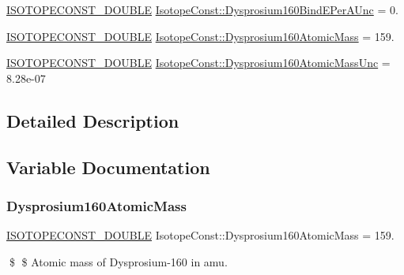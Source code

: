\begin{DoxyCompactItemize}
\mbox{\hyperlink{group___isotope_const-_macros_ga8f45a7272ce02c0b4c65c44636ed719a}{I\+S\+O\+T\+O\+P\+E\+C\+O\+N\+S\+T\+\_\+\+D\+O\+U\+B\+LE}} \mbox{\hyperlink{group___isotope_const-_dysprosium-_dy160_gaa8e61be4e1499f42c1e5876c6f315f16}{Isotope\+Const\+::\+Dysprosium160\+Bind\+E\+Per\+A\+Unc}} = 0.
\item 
\mbox{\hyperlink{group___isotope_const-_macros_ga8f45a7272ce02c0b4c65c44636ed719a}{I\+S\+O\+T\+O\+P\+E\+C\+O\+N\+S\+T\+\_\+\+D\+O\+U\+B\+LE}} \mbox{\hyperlink{group___isotope_const-_dysprosium-_dy160_ga260ca81902a70afa72e9724f9740c022}{Isotope\+Const\+::\+Dysprosium160\+Atomic\+Mass}} = 159.
\item 
\mbox{\hyperlink{group___isotope_const-_macros_ga8f45a7272ce02c0b4c65c44636ed719a}{I\+S\+O\+T\+O\+P\+E\+C\+O\+N\+S\+T\+\_\+\+D\+O\+U\+B\+LE}} \mbox{\hyperlink{group___isotope_const-_dysprosium-_dy160_ga0ae39125c6aefd5640c803d79afe2ffe}{Isotope\+Const\+::\+Dysprosium160\+Atomic\+Mass\+Unc}} = 8.\+28e-\/07
\end{DoxyCompactItemize}


\subsection{Detailed Description}


\subsection{Variable Documentation}
\mbox{\label{group___isotope_const-_dysprosium-_dy160_ga260ca81902a70afa72e9724f9740c022}} 
\subsubsection{\texorpdfstring{Dysprosium160\+Atomic\+Mass}{Dysprosium160AtomicMass}}
{\footnotesize\ttfamily \mbox{\hyperlink{group___isotope_const-_macros_ga8f45a7272ce02c0b4c65c44636ed719a}{I\+S\+O\+T\+O\+P\+E\+C\+O\+N\+S\+T\+\_\+\+D\+O\+U\+B\+LE}} Isotope\+Const\+::\+Dysprosium160\+Atomic\+Mass = 159.}

\$ \$ Atomic mass of Dysprosium-\/160 in amu. \mbox{\label{group___isotope_const-_dysprosium-_dy160_ga0ae39125c6aefd5640c803d79afe2ffe}} 
